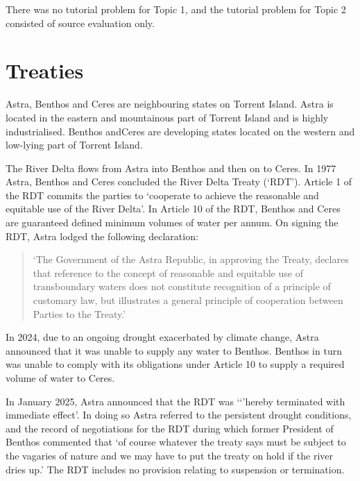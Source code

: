 There was no tutorial problem for Topic 1, and the tutorial problem for Topic 2 consisted of source evaluation only.
\setcounter{section}{2}

\section{Treaties}
\begin{tutorialquestion}
    \flushleft
    Astra, Benthos and Ceres are neighbouring states on Torrent Island. Astra is located  in the eastern and mountainous part of Torrent Island and is highly industrialised. Benthos andCeres are developing states located on the western and low-lying part of Torrent Island.

    \vspace{\baselineskip}

    The River Delta flows from Astra into Benthos and then on to Ceres. In 1977 Astra, Benthos and Ceres concluded the River Delta Treaty (`RDT'). Article 1 of the RDT commits the parties to `cooperate to achieve the reasonable and equitable use of the River Delta'. In Article 10 of the RDT, Benthos and Ceres are guaranteed defined minimum volumes of water per annum. On signing the RDT, Astra lodged the following declaration:

    \begin{quote}
        `The Government of the Astra Republic, in approving the Treaty, declares that reference to the concept of reasonable and equitable use of transboundary waters does not constitute recognition of a principle of customary law, but illustrates a general principle of cooperation between Parties to the Treaty.'
    \end{quote}

    In 2024, due to an ongoing drought exacerbated by climate change, Astra announced that it was unable to supply any water to Benthos. Benthos in turn was unable to comply with its obligations under Article 10 to supply a required volume of water to Ceres.

    \vspace{\baselineskip}

    In January 2025, Astra announced that the RDT was `‘'hereby terminated with immediate effect'. In doing so Astra referred to the persistent drought conditions, and the record of negotiations for the RDT during which former President of Benthos commented that `of course whatever the treaty says must be subject to the vagaries of nature and we may have to put the treaty on hold if the river dries up.' The RDT includes no provision relating to suspension or termination.


\end{tutorialquestion}
